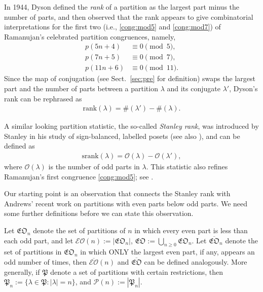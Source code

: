 \documentclass[12pt,reqno]{amsart}
\numberwithin{equation}{section}
\theoremstyle{plain}
\theoremstyle{definition}
\def\fP{\mathfrak{P}}
\begin{document}
In 1944, Dyson \cite{Dys} defined the \emph{rank} of a partition as the largest part minus the number of
parts, and then observed that the rank appears to give combinatorial interpretations for the first two (i.e.,
\eqref{cong:mod5} and \eqref{cong:mod7}) of Ramanujan's celebrated partition congruences, namely,
\begin{align}
p(5n+4) &\equiv0\pmod{5},\label{cong:mod5}\\
p(7n+5) &\equiv0\pmod{7},\label{cong:mod7}\\
p(11n+6) &\equiv0\pmod{11}.\label{cong:mod11}
\end{align}
Since the map of conjugation (see Sect.~\ref{sec:pre} for definition) swaps the largest part and the number
of parts between a partition $\lambda$ and its conjugate $\lambda'$, Dyson's rank can be rephrased as
\begin{align*}
\textrm{rank}(\lambda)=\#(\lambda')-\#(\lambda).
\end{align*}

A similar looking partition statistic, the so-called {\em Stanley rank}, was introduced by Stanley \cite{sta}
in his study of sign-balanced, labelled posets (see also \cite{and1, BG1, BG2}), and can be defined as
\begin{align}
\textrm{srank}(\lambda)=\mathcal{O}(\lambda)-\mathcal{O}(\lambda'),
\end{align}
where $\mathcal{O}(\lambda)$ is the number of odd parts in $\lambda$. This statistic also refines Ramanujan's
first congruence \eqref{cong:mod5}; see \cite[Corollary~1.2]{and1}.

Our starting point is an observation that connects the Stanley rank with Andrews' recent work \cite{and2} on
partitions with even parts below odd parts. We need some further definitions before we can state this
observation.

Let $\mathfrak{EO}_n$ denote the set of partitions of $n$ in which every even part is less than each odd
part, and let $\mathcal{EO}(n):=|\mathfrak{EO}_n|$, $\mathfrak{EO}:=\bigcup_{n\ge 0}\mathfrak{EO}_n$. Let
$\overline{\mathfrak{EO}}_n$ denote the set of partitions in $\mathfrak{EO}_n$ in which ONLY the largest even
part, if any, appears an odd number of times, then $\overline{\mathcal{EO}}(n)$ and
$\overline{\mathfrak{EO}}$ can be defined analogously. More generally, if $\mathfrak{P}$ denote a set of
partitions with certain restrictions, then $\mathfrak{P}_n:=\{\lambda\in\fP:|\lambda|=n\}$, and
$\mathcal{P}(n):=|\mathfrak{P}_n|$.
\end{document}
